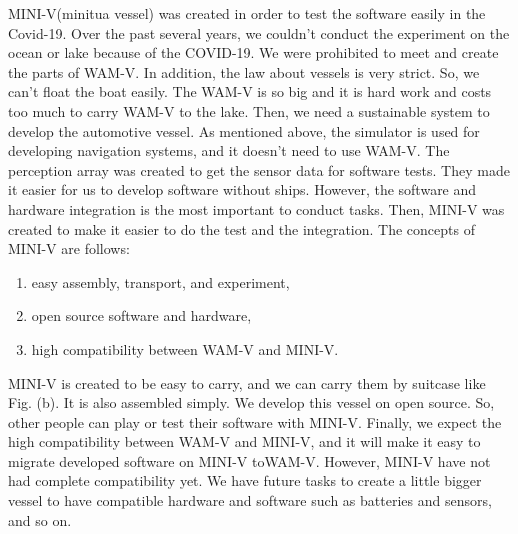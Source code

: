  MINI-V(minitua vessel) was created in order to test the software easily in the Covid-19. Over the past several years, 
we couldn't conduct the experiment on the ocean or lake because of the COVID-19. 
We were prohibited to meet and create the parts of WAM-V.
 In addition, the law about vessels is very strict.
So, we can't float the boat easily. The WAM-V is so big and it is hard work and costs too much to carry WAM-V to the lake. 
Then, we need a sustainable system to develop the automotive vessel.
As mentioned above, the simulator is used for developing navigation systems, and it doesn't need to use WAM-V.
The perception array was created to get the sensor data for software tests. They made it easier for us to develop software without ships.
 However, the software and hardware integration is the most important to conduct tasks. Then, MINI-V was created 
to make it easier to do the test and the integration. 
The concepts of MINI-V are follows:
\begin{enumerate}
  \item easy assembly, transport, and experiment,
  \item open source software and hardware,
  \item high compatibility between WAM-V and MINI-V.
\end{enumerate}
 MINI-V is created to be easy to carry, and we can carry them by suitcase like Fig. (b). 
It is also assembled simply. We develop this vessel on open source. So, other people can play or test their software with MINI-V. Finally, 
we expect the high compatibility between WAM-V and MINI-V, and it will make it easy to migrate developed software on MINI-V toWAM-V. However, 
MINI-V have not had complete compatibility yet. 
We have future tasks to create a little bigger vessel to have compatible hardware and software such as batteries and sensors, and so on. 

